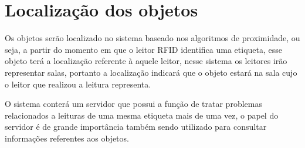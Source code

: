 \section{Localização dos objetos}
Os objetos serão localizado no sistema baseado nos algoritmos de proximidade, ou seja, a partir do momento em que o leitor RFID identifica uma etiqueta, esse objeto terá a localização referente à aquele leitor, nesse sistema os leitores irão representar salas, portanto a localização indicará que o objeto estará na sala cujo o leitor que realizou a leitura representa.
\par
O sistema conterá um servidor que possui a função de tratar problemas relacionados a leituras de uma mesma etiqueta mais de uma vez, o papel do servidor é de grande importância também sendo utilizado para consultar informações referentes aos objetos. 

